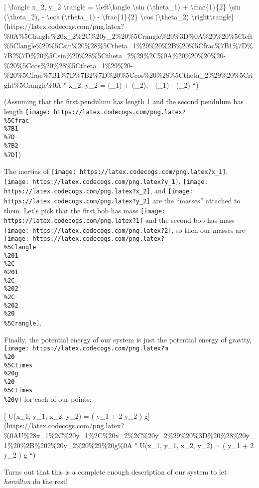 \documentclass[]{article}
\begin{document}
{[} \textbackslash{}langle x\_2, y\_2 \textbackslash{}rangle =
\textbackslash{}left\textbackslash{}langle \textbackslash{}sin
(\textbackslash{}theta\_1) + \textbackslash{}frac\{1\}\{2\} \textbackslash{}sin
(\textbackslash{}theta\_2), - \textbackslash{}cos (\textbackslash{}theta\_1) -
\textbackslash{}frac\{1\}\{2\} \textbackslash{}cos (\textbackslash{}theta\_2)
\textbackslash{}right\textbackslash{}rangle{]}(https://latex.codecogs.com/png.latex?\%0A\%5Clangle\%20x\_2\%2C\%20y\_2\%20\%5Crangle\%20\%3D\%0A\%20\%20\%5Cleft\%5Clangle\%20\%5Csin\%20\%28\%5Ctheta\_1\%29\%20\%2B\%20\%5Cfrac\%7B1\%7D\%7B2\%7D\%20\%5Csin\%20\%28\%5Ctheta\_2\%29\%2C\%0A\%20\%20\%20\%20-\%20\%5Ccos\%20\%28\%5Ctheta\_1\%29\%20-\%20\%5Cfrac\%7B1\%7D\%7B2\%7D\%20\%5Ccos\%20\%28\%5Ctheta\_2\%29\%20\%5Cright\%5Crangle\%0A
" \langle x\_2, y\_2 \rangle = \left\langle \sin (\theta\_1) + 
\sin (\theta\_2), - \cos (\theta\_1) -  \cos (\theta\_2)
\right\rangle
``)

(Assuming that the first pendulum has length 1 and the second pendulum has
length
\texttt{[image: https://latex.codecogs.com/png.latex?\\\%5Cfrac\\\%7B1\\\%7D\\\%7B2\\\%7D]})

The inertias of \texttt{[image: https://latex.codecogs.com/png.latex?x\_1]},
\texttt{[image: https://latex.codecogs.com/png.latex?y\_1]},
\texttt{[image: https://latex.codecogs.com/png.latex?x\_2]}, and
\texttt{[image: https://latex.codecogs.com/png.latex?y\_2]} are the ``masses''
attached to them. Let's pick that the first bob has mass
\texttt{[image: https://latex.codecogs.com/png.latex?1]} and the second bob has
mass \texttt{[image: https://latex.codecogs.com/png.latex?2]}, so then our
masses are
\texttt{[image: https://latex.codecogs.com/png.latex?\\\%5Clangle\\\%201\\\%2C\\\%201\\\%2C\\\%202\\\%2C\\\%202\\\%20\\\%5Crangle]}.

Finally, the potential energy of our system is just the potential energy of
gravity,
\texttt{[image: https://latex.codecogs.com/png.latex?m\\\%20\\\%5Ctimes\\\%20g\\\%20\\\%5Ctimes\\\%20y]}
for each of our points:

{[} U(x\_1, y\_1, x\_2, y\_2) = ( y\_1 + 2 y\_2 )
g{]}(https://latex.codecogs.com/png.latex?\%0AU\%28x\_1\%2C\%20y\_1\%2C\%20x\_2\%2C\%20y\_2\%29\%20\%3D\%20\%28\%20y\_1\%20\%2B\%202\%20y\_2\%20\%29\%20g\%0A
" U(x\_1, y\_1, x\_2, y\_2) = ( y\_1 + 2 y\_2 ) g ``)

Turns out that this is a complete enough description of our system to let
\emph{hamilton} do the rest!
\end{document}
